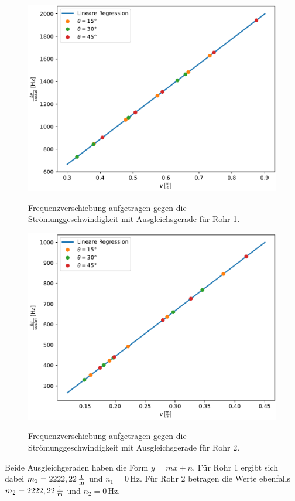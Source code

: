 \begin{figure}[H]
   \centering
   \caption{Frequenzverschiebung aufgetragen gegen die Strömunggeschwindigkeit mit Ausgleichsgerade für Rohr 1.}
   \includegraphics[width=\linewidth]{plot1.pdf}
   \label{fig:Abschnitt1_10mm}
\end{figure}

\begin{figure}[H]
    \centering
    \caption{Frequenzverschiebung aufgetragen gegen die Strömunggeschwindigkeit mit Ausgleichsgerade für Rohr 2.}
    \includegraphics[width=\linewidth]{plot2.pdf}
    \label{fig:Abschnitt1_16mm}
\end{figure}
Beide Ausgleichgeraden haben die Form $y = mx + n$. Für Rohr 1 ergibt sich dabei $m_1 = 2222,22 \, \unit[per-mode=fraction]{\per\meter}$ und $n_1 = 0 \, \unit{\hertz}$. Für Rohr 2 betragen die Werte 
ebenfalls  $m_2 = 2222,22 \, \unit[per-mode=fraction]{\per\meter}$ und $n_2 = 0 \, \unit{\hertz}$. 

